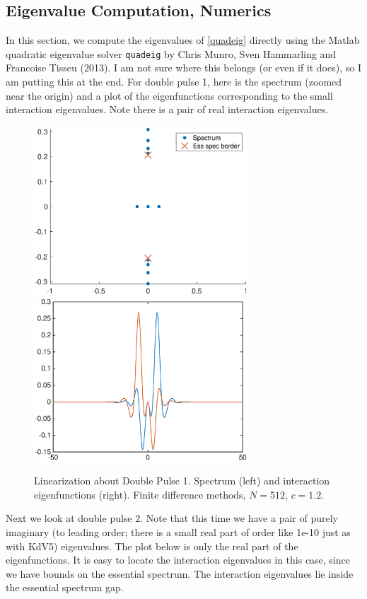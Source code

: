 \documentclass[12pt]{article}
\begin{document}
\subsection{Eigenvalue Computation, Numerics}

In this section, we compute the eigenvalues of \eqref{quadeig} directly using the Matlab quadratic eigenvalue solver \texttt{quadeig} by Chris Munro, Sven Hammarling and Francoise Tisseu (2013). I am not sure where this belongs (or even if it does), so I am putting this at the end. For double pulse 1, here is the spectrum (zoomed near the origin) and a plot of the eigenfunctions corresponding to the small interaction eigenvalues. Note there is a pair of real interaction eigenvalues.

\begin{figure}[H]
\centering
\includegraphics[width=8cm]{spec12_double1.eps}
\includegraphics[width=8cm]{evecs12_double1.eps}
\caption{Linearization about Double Pulse 1. Spectrum (left) and interaction eigenfunctions (right). Finite difference methods, $N = 512$, $c = 1.2$.}
\end{figure}

Next we look at double pulse 2. Note that this time we have a pair of purely imaginary (to leading order; there is a small real part of order like 1e-10 just as with KdV5) eigenvalues. The plot below is only the real part of the eigenfunctions. It is easy to locate the interaction eigenvalues in this case, since we have bounds on the essential spectrum. The interaction eigenvalues lie inside the essential spectrum gap.
\end{document}
